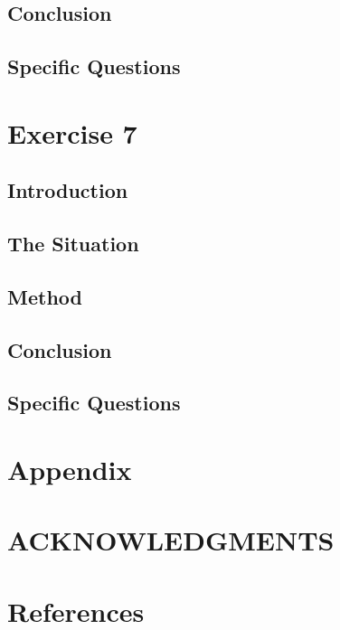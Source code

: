 \documentclass[reprint,english,notitlepage]{revtex4-2}
\begin{document}
  \subsection{Conclusion} 

  \subsection{Specific Questions}


\section{Exercise 7}

  \subsection{Introduction}

  \subsection{The Situation}

  \subsection{Method}

  \subsection{Conclusion} 

  \subsection{Specific Questions}



\section{Appendix} \label{sec: appendix}

\section*{ACKNOWLEDGMENTS}

\section*{References} \label{sec: references}
\end{document}
